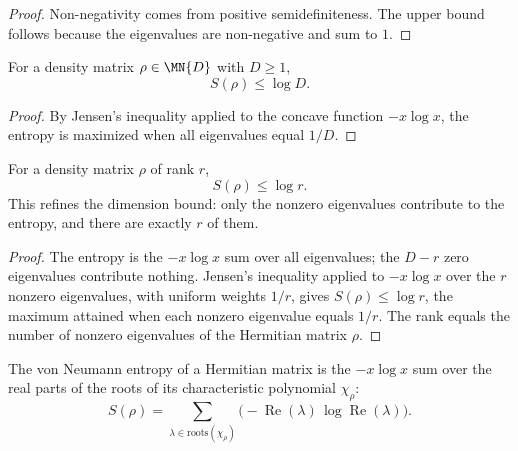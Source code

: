 \begin{proof}\leanok
    Non-negativity comes from positive semidefiniteness. The upper bound
    follows because the eigenvalues are non-negative and sum to $1$.
\end{proof}

\begin{theorem}\label{thm:entropy_le_log_dim}
    \leanok
    For a density matrix $\rho \in \MN{D}$ with $D \ge 1$,
    \[
        S(\rho) \le \log D.
    \]
\end{theorem}

\begin{proof}\leanok
    By Jensen's inequality applied to the concave function $-x \log x$,
    the entropy is maximized when all eigenvalues equal $1/D$.
\end{proof}

\begin{theorem}\label{thm:entropy_le_log_rank}
    \leanok
    For a density matrix $\rho$ of rank $r$,
    \[
        S(\rho) \le \log r.
    \]
    This refines the dimension bound: only the nonzero eigenvalues contribute to
    the entropy, and there are exactly $r$ of them.
\end{theorem}

\begin{proof}\leanok
    The entropy is the $-x\log x$ sum over all eigenvalues; the $D-r$ zero
    eigenvalues contribute nothing. Jensen's inequality applied to $-x\log x$
    over the $r$ nonzero eigenvalues, with uniform weights $1/r$, gives
    $S(\rho) \le \log r$, the maximum attained when each nonzero eigenvalue
    equals $1/r$. The rank equals the number of nonzero eigenvalues of the
    Hermitian matrix $\rho$.
\end{proof}

\begin{lemma}
    \label{lem:entropy_charpoly_roots}
    \leanok
    The von Neumann entropy of a Hermitian matrix is the $-x\log x$ sum over the
    real parts of the roots of its characteristic polynomial $\chi_\rho$:
    \[
        S(\rho) = \sum_{\lambda \in \mathrm{roots}(\chi_\rho)}
        \bigl({-}\operatorname{Re}(\lambda)\, \log \operatorname{Re}(\lambda)\bigr).
    \]
\end{lemma}

